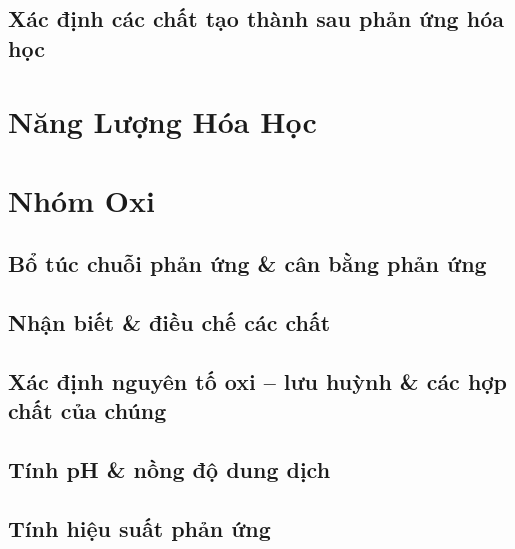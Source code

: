 \documentclass{article}
\numberwithin{equation}{section}
\begin{document}

\subsection{Xác định các chất tạo thành sau phản ứng hóa học}


\section{Năng Lượng Hóa Học}


\section{Nhóm Oxi}

\subsection{Bổ túc chuỗi phản ứng \& cân bằng phản ứng}


\subsection{Nhận biết \& điều chế các chất}


\subsection{Xác định nguyên tố oxi -- lưu huỳnh \& các hợp chất của chúng}


\subsection{Tính pH \& nồng độ dung dịch }


\subsection{Tính hiệu suất phản ứng}
\end{document}
